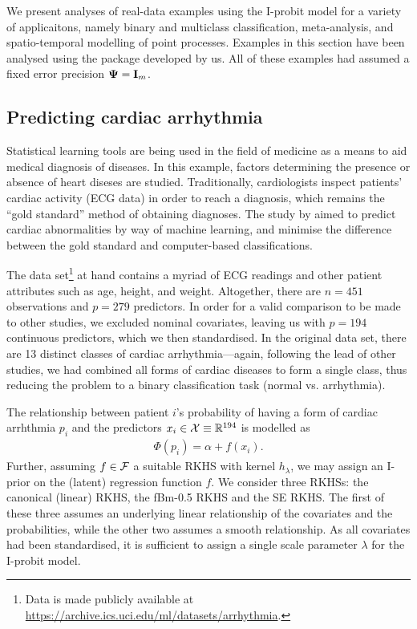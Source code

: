 \documentclass[a4paper,showframe,11pt]{report}\usepackage[]{graphicx}\usepackage[]{color}
\begin{document}

We present analyses of real-data examples using the I-probit model for a variety of applicaitons, namely binary and multiclass classification, meta-analysis, and spatio-temporal modelling of point processes.
Examples in this section have been analysed using the  package  developed by us.
All of these examples had assumed a fixed error precision ${\bm\Psi} = {\mathbf I}_m$.

\subsection{Predicting cardiac arrhythmia}

Statistical learning tools are being used in the field of medicine as a means to aid medical diagnosis of diseases.
In this example, factors determining the presence or absence of heart diseses are studied.
Traditionally, cardiologists inspect patients' cardiac activity (ECG data) in order to reach a diagnosis, which remains the ``gold standard'' method of obtaining diagnoses.
The study by \citet{guvenir1997supervised} aimed to predict cardiac abnormalities by way of machine learning, and minimise the difference between the gold standard and computer-based classifications.

The data set\footnote{Data is made publicly available at \url{https://archive.ics.uci.edu/ml/datasets/arrhythmia}.} at hand contains a myriad of ECG readings and other patient attributes such as age, height, and weight.
Altogether, there are $n=451$ observations and $p=279$ predictors.
In order for a valid comparison to be made to other studies, we excluded nominal covariates, leaving us with $p=194$ continuous predictors, which we then standardised.
In the original data set, there are 13 distinct classes of cardiac arrhythmia---again, following the lead of other studies, we had combined all forms of cardiac diseases to form a single class, thus reducing the problem to a binary classification task (normal vs. arrhythmia).

The relationship between patient $i$'s probability of having a form of cardiac arrhthmia $p_i$ and the predictors $x_i\in{\mathcal X} \equiv \mathbb{R}^{194}$ is modelled as
\begin{gather*}
  \Phi(p_i) = \alpha + f(x_i).
\end{gather*}
Further, assuming $f\in{\mathcal F}$ a suitable RKHS with kernel $h_\lambda$, we may assign an I-prior on the (latent) regression function $f$.
We consider three RKHSs: the canonical (linear) RKHS, the fBm-0.5 RKHS and the SE RKHS.
The first of these three assumes an underlying linear relationship of the covariates and the probabilities, while the other two assumes a smooth relationship.
As all covariates had been standardised, it is sufficient to assign a single scale parameter $\lambda$ for the I-probit model.
\end{document}
